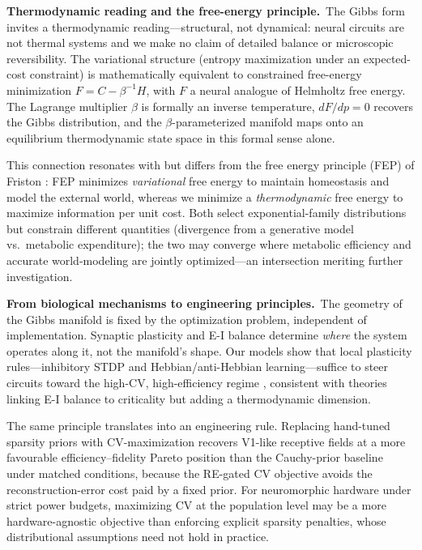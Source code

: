 \textbf{Thermodynamic reading and the free-energy principle.}~The Gibbs form invites a thermodynamic reading---structural, not dynamical: neural circuits are not thermal systems and we make no claim of detailed balance or microscopic reversibility.  The variational structure (entropy maximization under an expected-cost constraint) is mathematically equivalent to constrained free-energy minimization $F = C - \beta^{-1}H$, with $F$ a neural analogue of Helmholtz free energy.  The Lagrange multiplier $\beta$ is formally an inverse temperature, $dF/dp = 0$ recovers the Gibbs distribution, and the $\beta$-parameterized manifold maps onto an equilibrium thermodynamic state space in this formal sense alone.

This connection resonates with but differs from the free energy principle (FEP) of Friston \cite{friston_free-energy_2010}: FEP minimizes \emph{variational} free energy to maintain homeostasis and model the external world, whereas we minimize a \emph{thermodynamic} free energy to maximize information per unit cost.  Both select exponential-family distributions but constrain different quantities (divergence from a generative model vs.\ metabolic expenditure); the two may converge where metabolic efficiency and accurate world-modeling are jointly optimized---an intersection meriting further investigation.

\textbf{From biological mechanisms to engineering principles.}~The geometry of the Gibbs manifold is fixed by the optimization problem, independent of implementation.  Synaptic plasticity and E-I balance determine \emph{where} the system operates along it, not the manifold's shape.  Our models show that local plasticity rules---inhibitory STDP \cite{16,sp_stdp} and Hebbian/anti-Hebbian learning---suffice to steer circuits toward the high-CV, high-efficiency regime \cite{43}, consistent with theories linking E-I balance to criticality \cite{Liang2025prl} but adding a thermodynamic dimension.

The same principle translates into an engineering rule.  Replacing hand-tuned sparsity priors with CV-maximization recovers V1-like receptive fields at a more favourable efficiency--fidelity Pareto position than the Cauchy-prior baseline under matched conditions, because the RE-gated CV objective avoids the reconstruction-error cost paid by a fixed prior.  For neuromorphic hardware under strict power budgets, maximizing CV at the population level may be a more hardware-agnostic objective than enforcing explicit sparsity penalties, whose distributional assumptions need not hold in practice.

